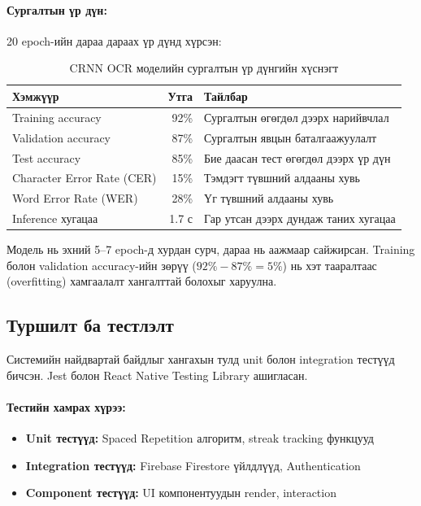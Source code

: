 \paragraph{Сургалтын үр дүн:}

20 epoch-ийн дараа дараах үр дүнд хүрсэн:

\begin{table}[H]
\centering
\caption{CRNN OCR моделийн сургалтын үр дүнгийн хүснэгт}
\label{tab:ocr-training-results}
\begin{tabular}{|l|r|l|}
\hline
\textbf{Хэмжүүр} & \textbf{Утга} & \textbf{Тайлбар} \\
\hline
Training accuracy & 92\% & Сургалтын өгөгдөл дээрх нарийвчлал \\
\hline
Validation accuracy & 87\% & Сургалтын явцын баталгаажуулалт \\
\hline
Test accuracy & 85\% & Бие даасан тест өгөгдөл дээрх үр дүн \\
\hline
Character Error Rate (CER) & 15\% & Тэмдэгт түвшний алдааны хувь \\
\hline
Word Error Rate (WER) & 28\% & Үг түвшний алдааны хувь \\
\hline
Inference хугацаа & 1.7 с & Гар утсан дээрх дундаж таних хугацаа \\
\hline
\end{tabular}
\end{table}

Модель нь эхний 5--7 epoch-д хурдан сурч, дараа нь аажмаар сайжирсан. Training болон validation accuracy-ийн зөрүү ($92\% - 87\% = 5\%$) нь хэт тааралтаас (overfitting) хамгаалалт хангалттай болохыг харуулна.


\subsection{Туршилт ба тестлэлт}
\label{subsec:testing}

Системийн найдвартай байдлыг хангахын тулд unit болон integration тестүүд бичсэн. Jest болон React Native Testing Library ашигласан.

\paragraph{Тестийн хамрах хүрээ:}

\begin{itemize}
    \item \textbf{Unit тестүүд:} Spaced Repetition алгоритм, streak tracking функцууд
    \item \textbf{Integration тестүүд:} Firebase Firestore үйлдлүүд, Authentication
    \item \textbf{Component тестүүд:} UI компонентуудын render, interaction
\end{itemize}

